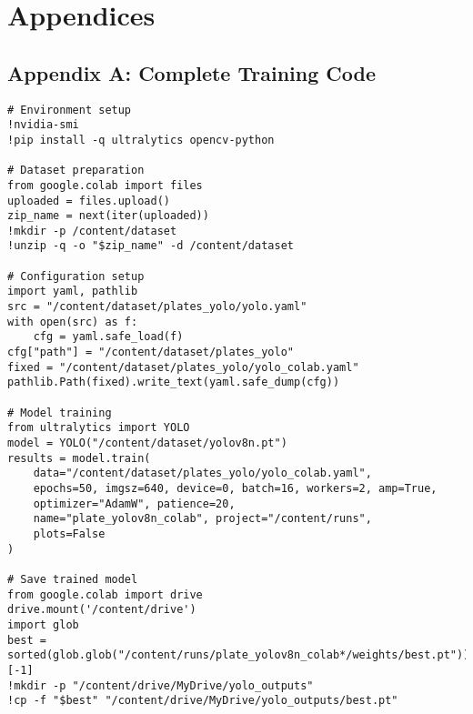 \documentclass[12pt,a4paper]{article}
\begin{document}
\section{Appendices}

\subsection{Appendix A: Complete Training Code}
\begin{lstlisting}[caption=Complete Training Implementation]
# Environment setup
!nvidia-smi
!pip install -q ultralytics opencv-python

# Dataset preparation
from google.colab import files
uploaded = files.upload()
zip_name = next(iter(uploaded))
!mkdir -p /content/dataset
!unzip -q -o "$zip_name" -d /content/dataset

# Configuration setup
import yaml, pathlib
src = "/content/dataset/plates_yolo/yolo.yaml"
with open(src) as f:
    cfg = yaml.safe_load(f)
cfg["path"] = "/content/dataset/plates_yolo"
fixed = "/content/dataset/plates_yolo/yolo_colab.yaml"
pathlib.Path(fixed).write_text(yaml.safe_dump(cfg))

# Model training
from ultralytics import YOLO
model = YOLO("/content/dataset/yolov8n.pt")
results = model.train(
    data="/content/dataset/plates_yolo/yolo_colab.yaml",
    epochs=50, imgsz=640, device=0, batch=16, workers=2, amp=True,
    optimizer="AdamW", patience=20,
    name="plate_yolov8n_colab", project="/content/runs",
    plots=False
)

# Save trained model
from google.colab import drive
drive.mount('/content/drive')
import glob
best = sorted(glob.glob("/content/runs/plate_yolov8n_colab*/weights/best.pt"))[-1]
!mkdir -p "/content/drive/MyDrive/yolo_outputs"
!cp -f "$best" "/content/drive/MyDrive/yolo_outputs/best.pt"
\end{lstlisting}
\end{document}
